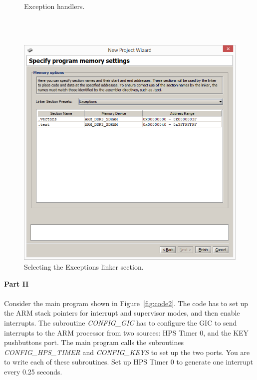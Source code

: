 \documentclass[epsfig,10pt,fullpage]{article}
\begin{document}
\begin{figure}[H]
\begin{center}

\end{center}
\caption{Exception handlers.}
\label{fig:handlers}
\end{figure}
~\\
~\\
\begin{figure}[htb]
	\begin{center}
	\includegraphics[scale=0.58]{figures/exceptions.png}
	\end{center}
	\vspace{-0.25cm}\caption{Selecting the {\sf Exceptions} linker section.}
\label{fig:exceptions}
\end{figure}

\clearpage
\noindent
{\bf Part II}
~\\
~\\
\noindent
Consider the main program shown in Figure~\ref{fig:code2}. The code has to set up 
the ARM stack pointers for interrupt and supervisor modes, and then enable interrupts.
The subroutine {\it CONFIG\_GIC} has to configure the GIC to send interrupts to the 
ARM processor from
two sources: HPS Timer 0, and the KEY pushbuttons port. The main program calls the
subroutines {\it CONFIG\_HPS\_TIMER} and {\it CONFIG\_KEYS} to set up the two ports. You
are to write each of these subroutines. Set up HPS Timer 0 to generate one interrupt
every 0.25 seconds.
\end{document}
